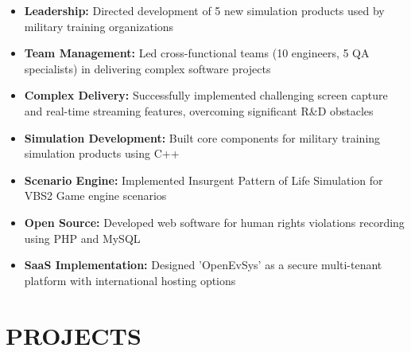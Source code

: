 \documentclass{fullstackdeveloper-ats}
\begin{document}

\begin{itemize}
    \item \textbf{Leadership:} Directed development of 5 new simulation products used by military training organizations
    \item \textbf{Team Management:} Led cross-functional teams (10 engineers, 5 QA specialists) in delivering complex software projects
    \item \textbf{Complex Delivery:} Successfully implemented challenging screen capture and real-time streaming features, overcoming significant R\&D obstacles
\end{itemize}

\vspace{0.5cm}


\begin{itemize}
    \item \textbf{Simulation Development:} Built core components for military training simulation products using C++
    \item \textbf{Scenario Engine:} Implemented Insurgent Pattern of Life Simulation for VBS2 Game engine scenarios
\end{itemize}

\vspace{0.5cm}


\begin{itemize}
    \item \textbf{Open Source:} Developed web software for human rights violations recording using PHP and MySQL
    \item \textbf{SaaS Implementation:} Designed 'OpenEvSys' as a secure multi-tenant platform with international hosting options
\end{itemize}

\vspace{0.5cm}

\section{PROJECTS}
\end{document}
